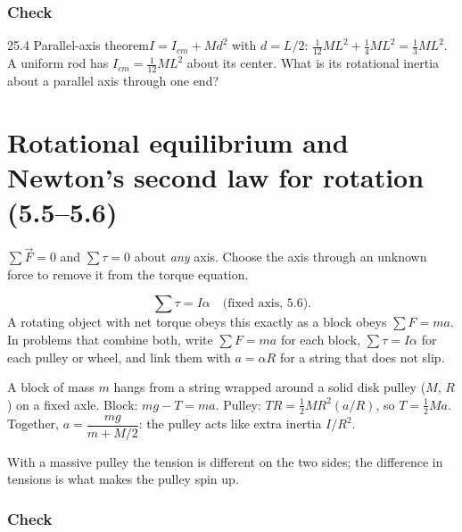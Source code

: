 \documentclass[11pt]{article}
\begin{document}
\subsubsection{Check}\mbox{}

\begin{q}{2}{5.4 Parallel-axis theorem}{$I = I_{cm} + Md^2$ with $d = L/2$: $\tfrac1{12}ML^2 + \tfrac14 ML^2 = \tfrac13 ML^2$.}
A uniform rod has $I_{cm} = \tfrac1{12}ML^2$ about its center. What is its rotational inertia about a parallel axis through one end?
\end{q}

\section{Rotational equilibrium and Newton's second law for rotation (5.5--5.6)}\label{sec:4}

\begin{keyidea}
$\sum\vec F = 0$ and $\sum\tau = 0$ about \emph{any} axis. Choose the axis through an unknown force to remove it from the torque equation.
\end{keyidea}
\[ \sum\tau = I\alpha \quad \text{(fixed axis, 5.6)}. \]
A rotating object with net torque obeys this exactly as a block obeys $\sum F = ma$. In problems that combine both, write $\sum F = ma$ for each block, $\sum\tau = I\alpha$ for each pulley or wheel, and link them with $a = \alpha R$ for a string that does not slip.

\begin{example}
A block of mass $m$ hangs from a string wrapped around a solid disk pulley ($M$, $R$) on a fixed axle. Block: $mg - T = ma$. Pulley: $TR = \tfrac12 MR^2(a/R)$, so $T = \tfrac12 Ma$. Together, $a = \dfrac{mg}{m + M/2}$: the pulley acts like extra inertia $I/R^2$.
\end{example}

\begin{trap}
With a massive pulley the tension is different on the two sides; the difference in tensions is what makes the pulley spin up.
\end{trap}

\subsubsection{Check}\mbox{}
\end{document}
